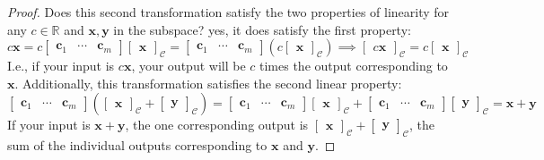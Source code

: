 \documentclass[draft,12pt]{report}
\renewcommand{\vec}[1]{\mathbf{#1}}
\begin{document}
\begin{proof}
    Does this second transformation satisfy the two properties of linearity for any $c \in \mathbb R$ and $\vec{x}, \vec{y}$ in the subspace? yes, it does satisfy the first property:
    \[ c\vec{x} = c\begin{bmatrix} \vec{c}_1 & \cdots & \vec{c}_m \end{bmatrix} \begin{bmatrix} \vec{x} \end{bmatrix}_\mathcal{C} = \begin{bmatrix} \vec{c}_1 & \cdots & \vec{c}_m \end{bmatrix} (c\begin{bmatrix} \vec{x} \end{bmatrix}_\mathcal{C}) \implies \begin{bmatrix} c\vec{x} \end{bmatrix}_\mathcal{C} = c\begin{bmatrix} \vec{x} \end{bmatrix}_\mathcal{C} \]
    I.e., if your input is $c\vec{x}$, your output will be $c$ times the output corresponding to $\vec{x}$. Additionally, this transformation satisfies the second linear property:
    \[ \begin{bmatrix} \vec{c}_1 & \cdots & \vec{c}_m \end{bmatrix} (\begin{bmatrix} \vec{x} \end{bmatrix}_\mathcal{C} + \begin{bmatrix} \vec{y} \end{bmatrix}_\mathcal{C}) = \begin{bmatrix} \vec{c}_1 & \cdots & \vec{c}_m \end{bmatrix} \begin{bmatrix} \vec{x} \end{bmatrix}_\mathcal{C} + \begin{bmatrix} \vec{c}_1 & \cdots & \vec{c}_m \end{bmatrix} \begin{bmatrix} \vec{y} \end{bmatrix}_\mathcal{C} = \vec{x} + \vec{y} \]
    If your input is $\vec{x} + \vec{y}$, the one corresponding output is $\begin{bmatrix} \vec{x} \end{bmatrix}_\mathcal{C} + \begin{bmatrix} \vec{y} \end{bmatrix}_\mathcal{C}$, the sum of the individual outputs corresponding to $\vec{x}$ and $\vec{y}$.
\end{proof}
\end{document}
